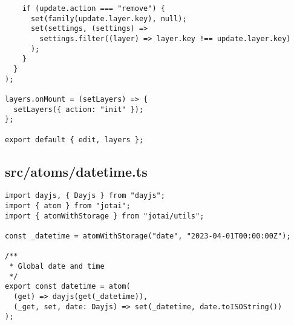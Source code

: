 \begin{verbatim}
    if (update.action === "remove") {
      set(family(update.layer.key), null);
      set(settings, (settings) =>
        settings.filter((layer) => layer.key !== update.layer.key)
      );
    }
  }
);

layers.onMount = (setLayers) => {
  setLayers({ action: "init" });
};

export default { edit, layers };

\end{verbatim}
\subsection{src/atoms/datetime.ts}
\begin{verbatim}
import dayjs, { Dayjs } from "dayjs";
import { atom } from "jotai";
import { atomWithStorage } from "jotai/utils";

const _datetime = atomWithStorage("date", "2023-04-01T00:00:00Z");

/**
 * Global date and time
 */
export const datetime = atom(
  (get) => dayjs(get(_datetime)),
  (_get, set, date: Dayjs) => set(_datetime, date.toISOString())
);

\end{verbatim}

